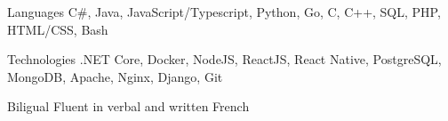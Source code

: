 


\begin{cvskills}

\cvskill
{Languages} %
{C\#, Java, JavaScript/Typescript, Python, Go, C, C++, SQL, PHP, HTML/CSS, Bash} %


\cvskill
{Technologies} %
{.NET Core, Docker, NodeJS, ReactJS, React Native, PostgreSQL, MongoDB, Apache, Nginx, Django, Git} %


\cvskill
{Biligual} %
{Fluent in verbal and written French} %


\end{cvskills}
\addvspace{2ex}
